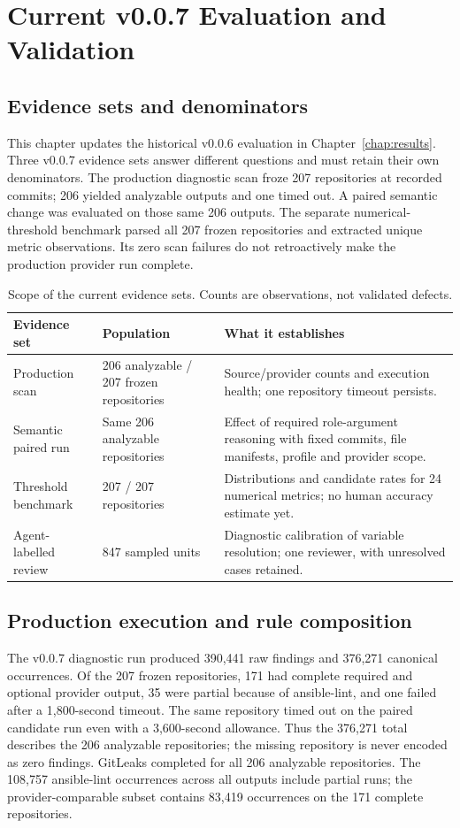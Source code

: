 \chapter{Current v0.0.7 Evaluation and Validation}
\label{chap:v007}

\section{Evidence sets and denominators}
This chapter updates the historical v0.0.6 evaluation in
Chapter~\ref{chap:results}. Three v0.0.7 evidence sets answer different
questions and must retain their own denominators. The production diagnostic
scan froze 207 repositories at recorded commits; 206 yielded analyzable
outputs and one timed out. A paired semantic change was evaluated on those
same 206 outputs. The separate numerical-threshold benchmark parsed all 207
frozen repositories and extracted unique metric observations. Its zero scan
failures do not retroactively make the production provider run complete.

\begin{table}[htbp]
\centering\small
\caption{Scope of the current evidence sets. Counts are observations, not validated defects.}
\label{tab:v007_scope}
\begin{tabularx}{\textwidth}{p{3.1cm}p{3.0cm}X}
\toprule
Evidence set & Population & What it establishes \\
\midrule
Production scan & 206 analyzable / 207 frozen repositories & Source/provider
counts and execution health; one repository timeout persists. \\
Semantic paired run & Same 206 analyzable repositories & Effect of required
role-argument reasoning with fixed commits, file manifests, profile and
provider scope. \\
Threshold benchmark & 207 / 207 repositories & Distributions and candidate
rates for 24 numerical metrics; no human accuracy estimate yet. \\
Agent-labelled review & 847 sampled units & Diagnostic calibration of
variable resolution; one reviewer, with unresolved cases retained. \\
\bottomrule
\end{tabularx}
\end{table}

\section{Production execution and rule composition}
The v0.0.7 diagnostic run produced 390,441 raw findings and 376,271 canonical
occurrences. Of the 207 frozen repositories, 171 had complete required and
optional provider output, 35 were partial because of ansible-lint, and one
failed after a 1,800-second timeout. The same repository timed out on the
paired candidate run even with a 3,600-second allowance. Thus the 376,271
total describes the 206 analyzable repositories; the missing repository is
never encoded as zero findings. GitLeaks completed for all 206 analyzable
repositories. The 108,757 ansible-lint occurrences across all outputs include
partial runs; the provider-comparable subset contains 83,419 occurrences on
the 171 complete repositories.

